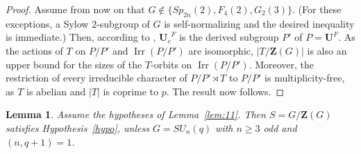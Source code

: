 \documentclass[12pt]{amsart}
\theoremstyle{plain}
\newtheorem{lem}[thm]{Lemma}
\theoremstyle{definition}
\numberwithin{equation}{section}
\newcommand{\Irr}{\operatorname{Irr}}
\newcommand{\bU}{{\mathbf{U}}}
\newcommand{\bZ}{{\mathbf{Z}}}
\begin{document}
\begin{proof}
Assume from now on that $G\notin \{Sp_{2n}(2),F_4(2),G_2(3)\}$. (For
these exceptions, a Sylow $2$-subgroup of $G$ is self-normalizing
and the desired inequality is immediate.) Then, according to
\cite[Lemma~5]{Brunat09}, ${\bU_c}^F$ is the derived subgroup $P'$
of $P=\bU^F$. As the actions of $T$ on $P/P'$ and $\Irr(P/P')$ are
isomorphic, $|T/\bZ(G)|$ is also an upper bound for the sizes of the
$T$-orbits on $\Irr(P/P')$. Moreover, the restriction of every
irreducible character of $P/P'\rtimes T$ to $P/P'$ is
multiplicity-free, as $T$ is abelian and $|T|$ is coprime to $p$.
The result now follows.
\end{proof}


\begin{lem}\label{lem:12}
Assume the hypotheses of Lemma~\ref{lem:11}. Then $S=G/\bZ(G)$
satisfies Hypothesis~\ref{hypo}, unless $G=SU_n(q)$ with $n\geq 3$
odd and $(n,q+1)=1$.
\end{lem}
\end{document}

